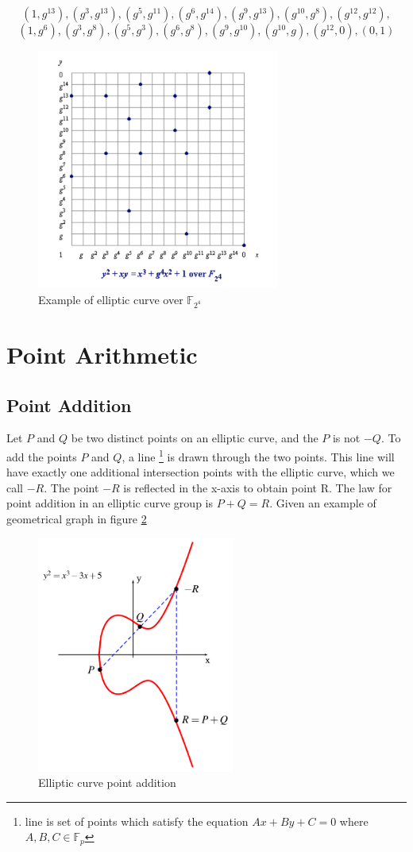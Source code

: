 $$(1,g^{13}), (g^3,g^{13}) ,(g^5,g^{11}),(g^6,g^{14}),(g^9,g^{13}),(g^{10},g^8),(g^{12},g^{12}),$$
$$(1,g^6),(g^3,g^8),(g^5,g^3),(g^6,g^8),(g^9,g^10),(g^10,g),(g^{12},0),(0,1)$$

    \begin{figure}[h!]
    	\centering
    	\includegraphics[width=80mm]{./pics/example_of_gf2m.png}
    	\caption{Example of elliptic curve over $\mathbb{F}_{2^4}$ }
    	\label{fig:ecc_gf2m_example}
    \end{figure}
    
\section{Point Arithmetic}
\subsection{Point Addition}
Let $P$ and $Q$ be two distinct points on an elliptic curve, and the $P$ is not $-Q$. To add the points $P$ and $Q$, a line \footnote{line is set of points which satisfy the equation $Ax+By+C = 0$ where $A,B,C \in \mathbb{F}_p$} is drawn through the two points. This line will have exactly one additional intersection points with the elliptic curve, which we call $-R$. The point $-R$ is reflected in the x-axis to obtain point R. The law for point addition in an elliptic curve group is $P+Q=R$. Given an example of geometrical graph in figure \ref{fig:ecc_point_addition} \\
    \begin{figure}[h!]
    	\centering
    	\includegraphics[width=65mm]{./pics/ecc_point_addition.png}
    	\caption{Elliptic curve point addition}
    	\label{fig:ecc_point_addition}
    \end{figure}
    
